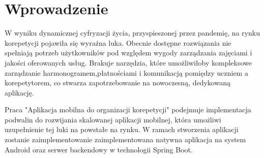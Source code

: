 \section*{Wprowadzenie}
W wyniku dynamicznej cyfryzacji życia, przyspieszonej przez pandemię, na rynku korepetycji pojawiła się wyraźna luka.
Obecnie dostępne rozwiązania nie spełniają potrzeb użytkowników pod względem wygody zarządzania zajęciami i jakości oferowanych usług.
Brakuje narzędzia, które umożliwiłoby kompleksowe zarządzanie harmonogramem,płatnościami i komunikacją pomiędzy uczniem a korepetytorem,
co stwarza zapotrzebowanie na nowoczesną, dedykowaną aplikację.

Praca "Aplikacja mobilna do organizacji korepetycji" podejmuje implementacja podwalin do rozwijania skalowanej aplikacji mobilnej, która umożliwi uzupełnienie tej luki na powstałe na rynku.
W ramach stworzenia aplikacji zostanie zaimplementowanie zaimplementowana natywna aplikacja na system Android oraz serwer backendowy w technologii Spring Boot.